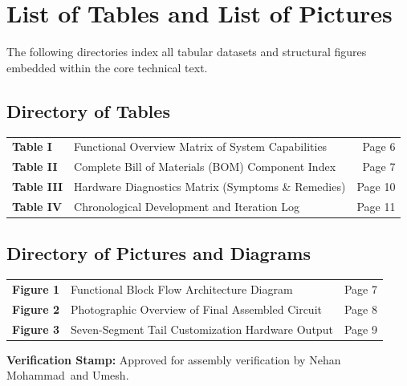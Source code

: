 \documentclass[12pt,letterpaper]{article}
\newcommand{\TeamMemberOne}{Nehan Mohammad}
\newcommand{\TeamMemberTwo}{Umesh}
\begin{document}
\section*{List of Tables and List of Pictures}

\noindent The following directories index all tabular datasets and structural figures embedded within the core technical text.

\vspace{0.8em}
\subsection*{Directory of Tables}
\vspace{0.4em}

\begin{tabularx}{\textwidth}{@{}p{18mm} X r@{}}
  \textbf{Table I} & Functional Overview Matrix of System Capabilities & Page 6 \\
  \textbf{Table II} & Complete Bill of Materials (BOM) Component Index & Page 7 \\
  \textbf{Table III} & Hardware Diagnostics Matrix (Symptoms \& Remedies) & Page 10 \\
  \textbf{Table IV} & Chronological Development and Iteration Log & Page 11 \\
\end{tabularx}

\vspace{1.2em}
\subsection*{Directory of Pictures and Diagrams}
\vspace{0.4em}

\begin{tabularx}{\textwidth}{@{}p{18mm} X r@{}}
  \textbf{Figure 1} & Functional Block Flow Architecture Diagram & Page 7 \\
  \textbf{Figure 2} & Photographic Overview of Final Assembled Circuit & Page 8 \\
  \textbf{Figure 3} & Seven-Segment Tail Customization Hardware Output & Page 9 \\
\end{tabularx}

\vspace{1.5em}
\noindent \textbf{Verification Stamp:} Approved for assembly verification by \TeamMemberOne\ and \TeamMemberTwo.
\end{document}
